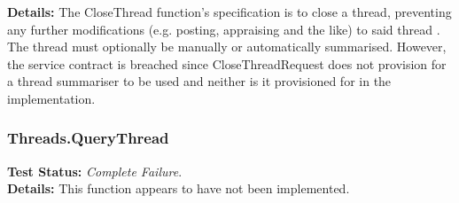 \begin{flushleft}
\begin{flushleft}
	\textbf{Details:}
	The CloseThread function's specification is to close a thread, preventing any further modifications (e.g. posting, appraising and the like) to said thread . The thread must optionally be manually or automatically summarised. However, the service contract is breached since CloseThreadRequest does not provision for a thread summariser to be used and neither is it provisioned for in the implementation.  
\end{flushleft}

\subsubsection{Threads.QueryThread}
\begin{flushleft}
	\textbf{Test Status:} \emph{Complete Failure}. \\

	\textbf{Details:}
	This function appears to have not been implemented.
	
\end{flushleft}

\end{flushleft}
